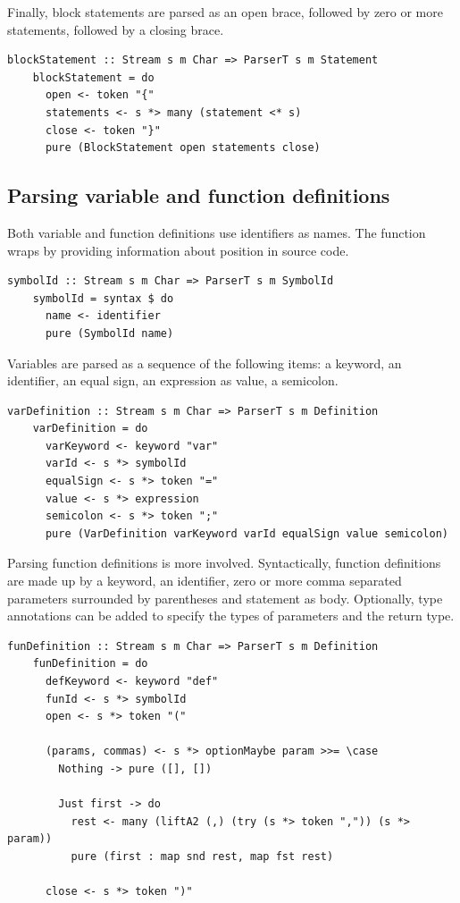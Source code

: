 \documentclass[UdineBachThesis,american,11pt]{PhdThesis}
\begin{document}
  Finally, block statements are parsed as an open brace, followed by zero or
  more statements, followed by a closing brace.

  \newpage

  \begin{lstlisting}[gobble=4,basicstyle=\ttfamily\small]
    blockStatement :: Stream s m Char => ParserT s m Statement
    blockStatement = do
      open <- token "{"
      statements <- s *> many (statement <* s)
      close <- token "}"
      pure (BlockStatement open statements close)
  \end{lstlisting}

  \subsection{Parsing variable and function definitions}

  Both variable and function definitions use identifiers as names. The function
  \lstinline@symbolId@ wraps \lstinline@identifier@ by providing information
  about position in source code.

  \begin{lstlisting}[gobble=4,basicstyle=\ttfamily\small]
    symbolId :: Stream s m Char => ParserT s m SymbolId
    symbolId = syntax $ do
      name <- identifier
      pure (SymbolId name)
  \end{lstlisting}

  Variables are parsed as a sequence of the following items: a \lstinline@var@
  keyword, an identifier, an equal sign, an expression as value, a semicolon.

  \begin{lstlisting}[gobble=4,basicstyle=\ttfamily\small]
    varDefinition :: Stream s m Char => ParserT s m Definition
    varDefinition = do
      varKeyword <- keyword "var"
      varId <- s *> symbolId
      equalSign <- s *> token "="
      value <- s *> expression
      semicolon <- s *> token ";"
      pure (VarDefinition varKeyword varId equalSign value semicolon)
  \end{lstlisting}

  Parsing function definitions is more involved. Syntactically, function
  definitions are made up by a \lstinline@def@ keyword, an identifier, zero or
  more comma separated parameters surrounded by parentheses and statement as
  body. Optionally, type annotations can be added to specify the types of
  parameters and the return type.

  \begin{lstlisting}[gobble=4,basicstyle=\ttfamily\small]
    funDefinition :: Stream s m Char => ParserT s m Definition
    funDefinition = do
      defKeyword <- keyword "def"
      funId <- s *> symbolId
      open <- s *> token "("

      (params, commas) <- s *> optionMaybe param >>= \case
        Nothing -> pure ([], [])

        Just first -> do
          rest <- many (liftA2 (,) (try (s *> token ",")) (s *> param))
          pure (first : map snd rest, map fst rest)

      close <- s *> token ")"
  \end{lstlisting}
\end{document}
